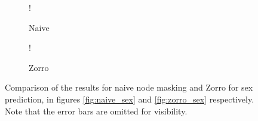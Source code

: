 \begin{figure}[H]
    \centering
        \begin{subfigure}{.5\textwidth}
            \centering
            \begin{center}
                \resizebox {1.0\linewidth} {!} {
                    
                }
            \end{center}
            \caption{Naive}
            \label{fig:comparison_sex_naive}
        \end{subfigure}%
        \begin{subfigure}{.5\textwidth}
            \centering
            \begin{center}
                \resizebox {1.0\linewidth} {!} {
                    
                }
            \end{center}
            \caption{Zorro}
            \label{fig:comparison_sex_zorro}
        \end{subfigure}
    \caption{Comparison of the results for naive node masking and Zorro for sex prediction, in figures \ref{fig:naive_sex} and \ref{fig:zorro_sex} respectively. Note that the error bars are omitted for visibility.}
    \label{fig:comparison_sex}
\end{figure}



